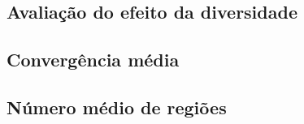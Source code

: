 \begin{apendicesenv}
\partapendices

\chapter{Avaliação do efeito da diversidade}

\section{Convergência média}

\section{Número médio de regiões}
\label{app:numeroMedioRegioes}

\end{apendicesenv}